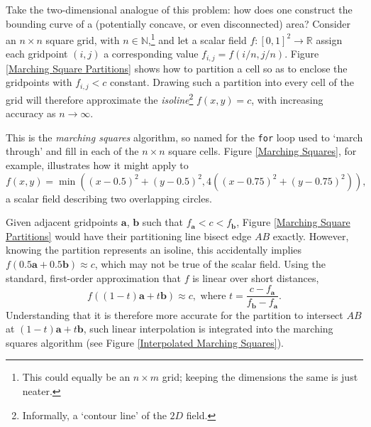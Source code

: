 \documentclass[a4paper, 11pt]{article}
\begin{document}
\begin{flushleft}
Take the two-dimensional analogue of this problem: how does one construct the bounding curve of a (potentially concave, or even disconnected) area? Consider an $n \times n$ square grid, with $n \in \mathbb{N}$,\footnote{This could equally be an $n \times m$ grid; keeping the dimensions the same is just neater.} and let a scalar field $f : [0,1]^2 \rightarrow \mathbb{R}$ assign each gridpoint $(i,j)$ a corresponding value $f_{i,j} = f(i/n,j/n)$. Figure \ref{Marching Square Partitions} shows how to partition a cell so as to enclose the gridpoints with $f_{i,j} < c$ constant. Drawing such a partition into every cell of the grid will therefore approximate the \textit{isoline}\footnote{Informally, a `contour line' of the $2D$ field.} $f(x,y) = c$, with increasing accuracy as $n \rightarrow \infty$.%



\vspace{5pt}\noindent
This is the \textit{marching squares} algorithm, so named for the \texttt{for} loop used to `march through' and fill in each of the $n \times n$ square cells. Figure \ref{Marching Squares}, for example, illustrates how it might apply to 
$$f(x,y) = \min\left(\left(x-0.5\right)^2+\left(y-0.5\right)^2,4\left(\left(x-0.75\right)^2+\left(y-0.75\right)^2\right)\right),$$
a scalar field describing two overlapping circles.


\vspace{5pt}\noindent
Given adjacent gridpoints $\mathbf{a}$, $\mathbf{b}$ such that $f_{\mathbf{a}} < c < f_{\mathbf{b}}$, Figure \ref{Marching Square Partitions} would have their partitioning line bisect edge $AB$ exactly. However, knowing the partition represents an isoline, this accidentally implies $f\left(0.5\mathbf{a} + 0.5\mathbf{b}\right) \approx c$, which may not be true of the scalar field. Using the standard, first-order approximation that $f$ is linear over short distances, 
$$f\left((1-t)\mathbf{a} + t\mathbf{b}\right) \approx c, \,\, \textrm{where} \,\, t = \frac{c-f_{\mathbf{a}}}{f_{\mathbf{b}}-f_{\mathbf{a}}}.$$
Understanding that it is therefore more accurate for the partition to intersect $AB$ at $(1-t)\mathbf{a} + t\mathbf{b}$, such linear interpolation is integrated into the marching squares algorithm (see Figure \ref{Interpolated Marching Squares}).


\end{flushleft}
\end{document}
